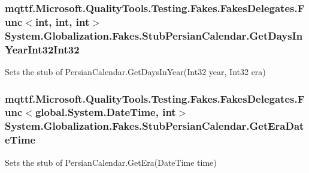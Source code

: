 \hypertarget{class_system_1_1_globalization_1_1_fakes_1_1_stub_persian_calendar_a27f28a7699256b2b4adbc326e901137f}{
\subsubsection[{Get\-Days\-In\-Year\-Int32\-Int32}]{\setlength{\rightskip}{0pt plus 5cm}mqttf.\-Microsoft.\-Quality\-Tools.\-Testing.\-Fakes.\-Fakes\-Delegates.\-Func$<$int, int, int$>$ System.\-Globalization.\-Fakes.\-Stub\-Persian\-Calendar.\-Get\-Days\-In\-Year\-Int32\-Int32}}\label{class_system_1_1_globalization_1_1_fakes_1_1_stub_persian_calendar_a27f28a7699256b2b4adbc326e901137f}


Sets the stub of Persian\-Calendar.\-Get\-Days\-In\-Year(\-Int32 year, Int32 era)

\hypertarget{class_system_1_1_globalization_1_1_fakes_1_1_stub_persian_calendar_a21442353fdba64cfaf07592e607bf4c6}{
\subsubsection[{Get\-Era\-Date\-Time}]{\setlength{\rightskip}{0pt plus 5cm}mqttf.\-Microsoft.\-Quality\-Tools.\-Testing.\-Fakes.\-Fakes\-Delegates.\-Func$<$global.\-System.\-Date\-Time, int$>$ System.\-Globalization.\-Fakes.\-Stub\-Persian\-Calendar.\-Get\-Era\-Date\-Time}}\label{class_system_1_1_globalization_1_1_fakes_1_1_stub_persian_calendar_a21442353fdba64cfaf07592e607bf4c6}


Sets the stub of Persian\-Calendar.\-Get\-Era(\-Date\-Time time)

